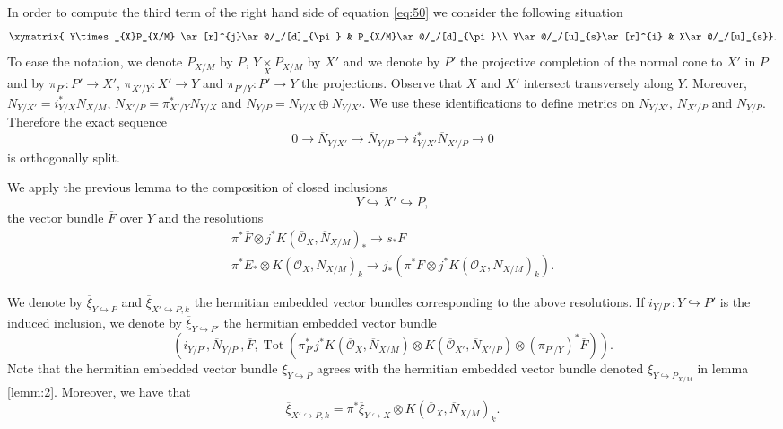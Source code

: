 \documentclass[10pt,twoside]{article}
\numberwithin{equation}{section}
\theoremstyle{plain}
\theoremstyle{definition}
\DeclareMathOperator{\Tot}{Tot}
\begin{document}
In order to compute the third term of the right hand side of equation
\eqref{eq:50} we consider the following situation
\begin{displaymath}
  \xymatrix{
Y\times _{X}P_{X/M} \ar[r]^{j}\ar@/_/[d]_{\pi} &
P_{X/M}\ar@/_/[d]_{\pi }\\ 
Y\ar@/_/[u]_{s}\ar[r]^{i} & X\ar@/_/[u]_{s}}.
\end{displaymath}
To ease the notation, we denote  $P_{X/M}$ by $P$, $Y\underset{X}{\times} P_{X/M}$ by
$X'$ and we 
denote by $P'$ the projective completion of the normal cone to $X'$ in
$P$ and by $\pi 
_{P'}\colon P'\longrightarrow X'$, $\pi _{X'/Y}\colon X'\longrightarrow Y$ and $\pi
_{P'/Y}\colon P'\longrightarrow Y$ the 
projections. Observe that $X$
and $X'$ intersect transversely along $Y$. Moreover,
$N_{Y/X'}=i^{\ast}_{Y/X}N_{X/M}$, $N_{X'/P}=\pi ^{\ast}_{X'/Y}N_{Y/X}$
and $N_{Y/P}=N_{Y/X}\oplus N_{Y/X'}$. We use these identifications to
define metrics on $N_{Y/X'}$, $N_{X'/P}$ and $N_{Y/P}$. Therefore the
exact sequence
\begin{displaymath}
  0\longrightarrow \overline N_{Y/X'}
  \longrightarrow \overline N_{Y/P}
  \longrightarrow i^{\ast}_{Y/X'}\overline N_{X'/P}
  \longrightarrow 0
\end{displaymath}
is orthogonally split.


We apply the previous lemma to the composition of closed
inclusions  
\begin{displaymath}
  Y\hookrightarrow X'\hookrightarrow P,
\end{displaymath}
the vector bundle $\overline F$ over $Y$ and the resolutions
\begin{gather*}
  \pi^{\ast}\overline F\otimes j^{\ast}K(\overline {\mathcal{O}}_{X},\overline
  N_{X/M})_{\ast}\longrightarrow
  s_{\ast}F\\
  \pi^{\ast}\overline E_{\ast}\otimes K(\overline
  {\mathcal{O}}_{X},\overline N_{X/M})_{k} 
  \longrightarrow j_{\ast}(\pi^{\ast}F\otimes
  j^{\ast}K(\mathcal{O}_{X},N_{X/M})_{k}).
\end{gather*}

We denote by $\overline \xi _{Y\hookrightarrow P}$ and  $\overline \xi
_{X'\hookrightarrow P,k}$ the
hermitian embedded vector bundles corresponding to the above
resolutions. If $i_{Y/P'}\colon Y\hookrightarrow P'$ is the induced
inclusion, we denote by 
$\overline \xi _{Y\hookrightarrow P'}$ the hermitian embedded vector bundle
\begin{displaymath}
  \left(i_{Y/P'},\overline N_{Y/P'}, \overline F,\Tot(\pi
  ^{\ast}_{P'}j^{\ast}K(\overline {\mathcal{O}}_{X},\overline
  N_{X/M})\otimes 
  K(\overline {\mathcal{O}}_{X'},\overline N_{X'/P})\otimes (\pi
  _{P'/Y})^{\ast}\overline F)\right).
\end{displaymath}
Note that the hermitian embedded vector bundle $\overline
\xi_{Y\hookrightarrow P}$ agrees with the 
hermitian embedded vector bundle denoted $\overline
\xi_{Y\hookrightarrow P_{X/M}}$ in lemma 
\ref{lemm:2}. Moreover, we have that
\begin{displaymath}
  \overline \xi_{X'\hookrightarrow P,k}=\pi ^{\ast}\overline \xi_{Y\hookrightarrow
    X}\otimes K(\overline {\mathcal{O}}_{X},\overline N_{X/M})_{k}.
\end{displaymath}
\end{document}
